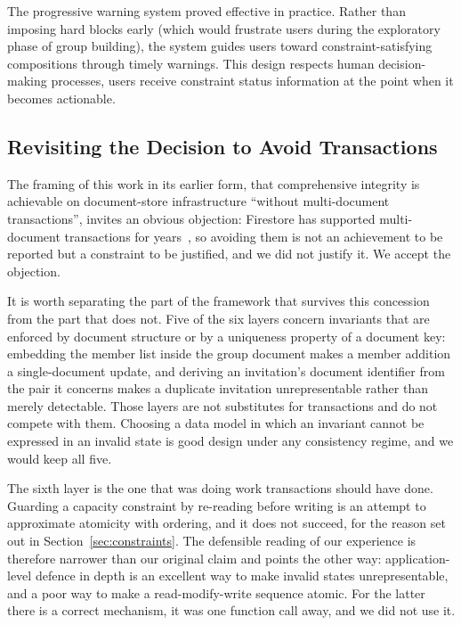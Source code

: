 \documentclass[11pt,a4paper]{article}
\theoremstyle{plain}
\theoremstyle{definition}
\theoremstyle{remark}
\begin{document}
The progressive warning system proved effective in practice. Rather than imposing hard blocks early (which would frustrate users during the exploratory phase of group building), the system guides users toward constraint-satisfying compositions through timely warnings. This design respects human decision-making processes, users receive constraint status information at the point when it becomes actionable.

\subsection{Revisiting the Decision to Avoid Transactions}

The framing of this work in its earlier form, that comprehensive integrity is achievable on document-store infrastructure ``without multi-document transactions'', invites an obvious objection: Firestore has supported multi-document transactions for years~\cite{firebase-transactions}, so avoiding them is not an achievement to be reported but a constraint to be justified, and we did not justify it. We accept the objection.

It is worth separating the part of the framework that survives this concession from the part that does not. Five of the six layers concern invariants that are enforced by document structure or by a uniqueness property of a document key: embedding the member list inside the group document makes a member addition a single-document update, and deriving an invitation's document identifier from the pair it concerns makes a duplicate invitation unrepresentable rather than merely detectable. Those layers are not substitutes for transactions and do not compete with them. Choosing a data model in which an invariant cannot be expressed in an invalid state is good design under any consistency regime, and we would keep all five.

The sixth layer is the one that was doing work transactions should have done. Guarding a capacity constraint by re-reading before writing is an attempt to approximate atomicity with ordering, and it does not succeed, for the reason set out in Section~\ref{sec:constraints}. The defensible reading of our experience is therefore narrower than our original claim and points the other way: application-level defence in depth is an excellent way to make invalid states unrepresentable, and a poor way to make a read-modify-write sequence atomic. For the latter there is a correct mechanism, it was one function call away, and we did not use it.
\end{document}
